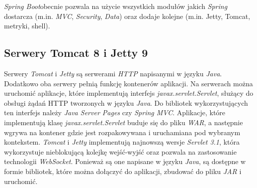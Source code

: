 \textsl{Spring Boot}obecnie pozwala na użycie wszystkich modułów jakich \textsl{Spring} dostarcza (m.in. \textsl{MVC}, \textsl{Security}, \textsl{Data}) oraz dodaje kolejne (m.in. Jetty, Tomcat, metryki, shell). 

\subsection{Serwery Tomcat 8 i Jetty 9} 
Serwery \textsl{Tomcat} i \textsl{Jetty} są serwerami \textsl{HTTP} napisanymi w języku \textsl{Java}. Dodatkowo oba serwery pełnią funkcję kontenerów aplikacji. Na serwerach można uruchomić aplikacje, które implementują interfejs \textsl{javax.servlet.Servlet}, służący do obsługi żądań HTTP tworzonych w języku \textsl{Java}. Do bibliotek wykorzystujących ten interfejs należy \textsl{Java Server Pages} czy \textsl{Spring MVC}. Aplikacje, które implementują klasę \textsl{javax.servlet.Servlet} buduje się do pliku \textsl{WAR}, a następnie wgrywa na kontener gdzie jest rozpakowywana i uruchamiana pod wybranym kontekstem. \textsl{Tomcat} i \textsl{Jetty} implementują najnowszą wersje \textsl{Servlet 3.1}, która wykorzystuje nieblokującą kolejkę wejść-wyjść oraz pozwala na zastosowanie technologii \textsl{WebSocket}. Ponieważ są one napisane  w języku \textsl{Java}, są dostępne w formie bibliotek, które można dołączyć do aplikacji, zbudować do pliku \textsl{JAR} i uruchomić. 
